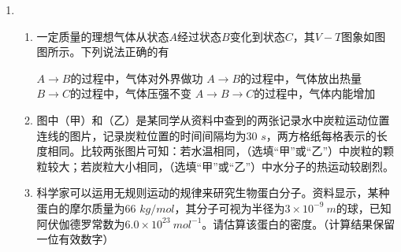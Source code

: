 \begin{enumerate}[leftmargin=0em]
\begin{enumerate}
\end{enumerate}




\newpage
\item 
{}
\begin{enumerate}
\renewcommand{\labelenumi}{\arabic{enumi}.}
\item
一定质量的理想气体从状态$ A $经过状态$ B $变化到状态$ C $，其$ V - T $图象如图图所示。下列说法正确的有  
\begin{figure}[h!]
\centering

\end{figure}


\fourchoices
{$ A \rightarrow B $的过程中，气体对外界做功}
{$ A \rightarrow B $的过程中，气体放出热量}
{$ B \rightarrow C $的过程中，气体压强不变}
{$ A \rightarrow B \rightarrow C $的过程中，气体内能增加}


\item 
图中（甲）和（乙）是某同学从资料中查到的两张记录水中炭粒运动位置连线的图片，记录炭粒位置的时间间隔均为$ 30 $ $ s $，两方格纸每格表示的长度相同。比较两张图片可知：若水温相同，（选填“甲”或“乙”）中炭粒的颗粒较大；若炭粒大小相同，（选填“甲”或“乙”）中水分子的热运动较剧烈。
\begin{figure}[h!]
\centering

\end{figure}

\item 
科学家可以运用无规则运动的规律来研究生物蛋白分子。资料显示，某种蛋白的摩尔质量为$ 66 $ $ kg/mol $，其分子可视为半径为$ 3 \times 10 ^{-9}\ m $的球，已知阿伏伽德罗常数为$ 6.0 \times 10^{23} \ mol^{-1} $。请估算该蛋白的密度。（计算结果保留一位有效数字）





\end{enumerate}



\end{enumerate}
